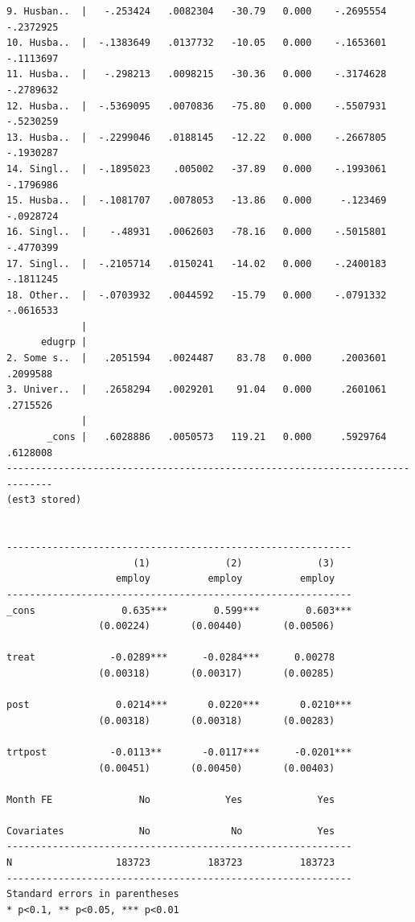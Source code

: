 \documentclass[
  letterpaper,
  DIV=11,
  numbers=noendperiod]{scrartcl}
\begin{document}
\begin{verbatim}
9. Husban..  |   -.253424   .0082304   -30.79   0.000    -.2695554   -.2372925
10. Husba..  |  -.1383649   .0137732   -10.05   0.000    -.1653601   -.1113697
11. Husba..  |   -.298213   .0098215   -30.36   0.000    -.3174628   -.2789632
12. Husba..  |  -.5369095   .0070836   -75.80   0.000    -.5507931   -.5230259
13. Husba..  |  -.2299046   .0188145   -12.22   0.000    -.2667805   -.1930287
14. Singl..  |  -.1895023    .005002   -37.89   0.000    -.1993061   -.1796986
15. Husba..  |  -.1081707   .0078053   -13.86   0.000     -.123469   -.0928724
16. Singl..  |    -.48931   .0062603   -78.16   0.000    -.5015801   -.4770399
17. Singl..  |  -.2105714   .0150241   -14.02   0.000    -.2400183   -.1811245
18. Other..  |  -.0703932   .0044592   -15.79   0.000    -.0791332   -.0616533
             |
      edugrp |
2. Some s..  |   .2051594   .0024487    83.78   0.000     .2003601    .2099588
3. Univer..  |   .2658294   .0029201    91.04   0.000     .2601061    .2715526
             |
       _cons |   .6028886   .0050573   119.21   0.000     .5929764    .6128008
------------------------------------------------------------------------------
(est3 stored)


------------------------------------------------------------
                      (1)             (2)             (3)   
                   employ          employ          employ   
------------------------------------------------------------
_cons               0.635***        0.599***        0.603***
                (0.00224)       (0.00440)       (0.00506)   

treat             -0.0289***      -0.0284***      0.00278   
                (0.00318)       (0.00317)       (0.00285)   

post               0.0214***       0.0220***       0.0210***
                (0.00318)       (0.00318)       (0.00283)   

trtpost           -0.0113**       -0.0117***      -0.0201***
                (0.00451)       (0.00450)       (0.00403)   

Month FE               No             Yes             Yes   

Covariates             No              No             Yes   
------------------------------------------------------------
N                  183723          183723          183723   
------------------------------------------------------------
Standard errors in parentheses
* p<0.1, ** p<0.05, *** p<0.01
\end{verbatim}
\end{document}
